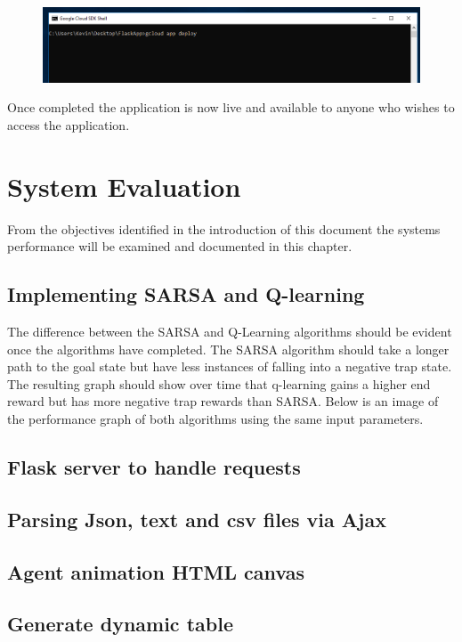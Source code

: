 \begin{figure}[H]
	\centering
	\includegraphics[width=1\linewidth]{img/DeployCmd}
	\caption{}
	\label{fig:deploycmd}
\end{figure}
Once completed the application is now live and available to anyone who wishes to access the application.



\chapter{System Evaluation}
From the objectives identified in the introduction of this document the systems performance will be examined and documented in this chapter.
\section{Implementing SARSA and Q-learning}
The difference between the SARSA and Q-Learning algorithms should be evident once the algorithms have completed. The SARSA algorithm should take a longer path to the goal state but have less instances of falling into a negative trap state.
The resulting graph should show over time that q-learning gains a higher end reward but has more negative trap rewards than SARSA.
Below is an image of the performance graph of both algorithms using the same input parameters.



\section{Flask server to handle requests}

\section{Parsing Json, text and csv files via Ajax}
\section{Agent animation HTML canvas}

\section{Generate dynamic table}

